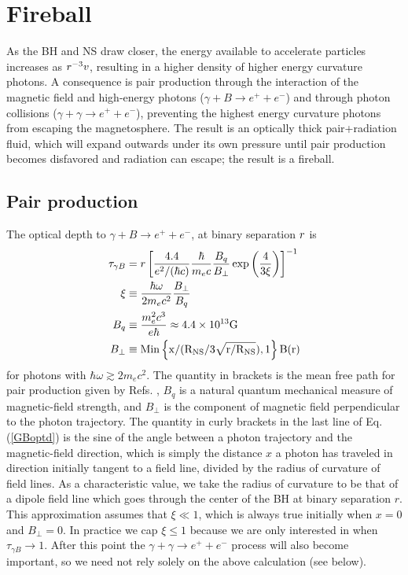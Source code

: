  
 

 




\section{Fireball}
\label{Fireball}
As the BH and NS draw closer, the energy available to accelerate
particles increases as $r^{-3}v$, resulting in a higher density of
higher energy curvature photons. A consequence is pair production
through the interaction of the magnetic field and high-energy photons
($\gamma + B \rightarrow e^{+} + e^{-}$) and through photon collisions
($\gamma + \gamma \rightarrow e^{+} + e^{-}$), preventing the highest
energy curvature photons from escaping the magnetosphere.  The result
is an optically thick pair+radiation fluid, which will expand outwards
under its own pressure until pair production becomes disfavored and
radiation can escape; the result is a fireball.

\subsection{Pair production}
The optical depth to $\gamma + B \rightarrow e^{+} + e^{-}$, at binary
separation $r$ is
\begin{align}
\label{GBoptd}
\tau_{\gamma B} &= \Rbin \left[\frac{4.4}{e^2 / (\hbar c)}
  \frac{\hbar}{m_e c} \frac{B_q}{B_{\perp}} \exp{\left(\frac{4}{3 \xi}\right)} \right]^{-1}  \\ 
%      
\xi &\equiv \frac{\hbar \omega}{2 m_e c^2} \frac{B_\perp}{B_q} \nonumber \\ 
%
B_q & \equiv \frac{m^2_e c^3}{e \hbar} \approx 4.4 \times 10^{13} \rm{G} \nonumber \\ \nonumber
   B_{\perp} &\equiv \rm{Min}\left\{x/(\RNS/ 3\sqrt{r/\RNS}),  1 \right\} B(r)
\end{align}
for photons with $\hbar \omega \gtrsim 2 m_e c^2$. The quantity in
brackets is the mean free path for pair production given by
Refs. \cite{Erber:1966, RudSuth:1975}, $B_q$ is a natural quantum
mechanical measure of magnetic-field strength, and $B_{\perp}$ is the
component of magnetic field perpendicular to the photon trajectory. 
The quantity in curly brackets in the last line of Eq. (\ref{GBoptd}) is the 
sine of the angle between a photon trajectory and the magnetic-field 
direction, which is simply the distance $x$ a photon has traveled in direction
initially tangent to a field line, divided by the radius 
of curvature of field lines. As a characteristic value, we take the radius 
of curvature to be that of a dipole field line which goes through the center 
of the BH at binary separation $r$.
This approximation assumes that $\xi \ll 1$, which is always true initially when $x=0$
and $B_{\perp} = 0$. In practice we cap $\xi\leq 1$ because we are
only interested in when $\tau_{\gamma B} \rightarrow 1$.  After this
point the $\gamma + \gamma \rightarrow e^{+} + e^{-}$ process will
also become important, so we need not rely solely on the above
calculation (see below).



